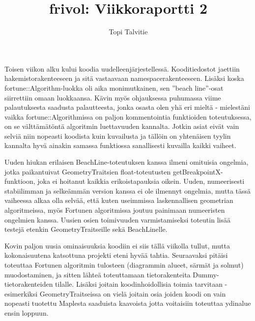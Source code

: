\documentclass[a4paper, 11pt, finnish]{article}
\author{Topi Talvitie}
\title{frivol: Viikkoraportti 2}
\begin{document}
\maketitle

Toisen viikon alku kului koodia uudelleenjärjestellessä. Kooditiedostot jaettiin hakemistorakenteeseen ja sitä vastaavaan namespacerakenteeseen. Lisäksi koska fortune::Algorithm-luokka oli aika monimutkainen, sen ''beach line''-osat siirrettiin omaan luokkaansa. Kävin myös ohjauksessa puhumassa viime palautuksesta saadusta palautteesta, jonka osasta olen yhä eri mieltä - mielestäni vaikka fortune::Algorithmissa on paljon kommentointia funktioiden toteutuksessa, on se välttämätöntä algoritmin luettavuuden kannalta. Jotkin asiat eivät vain selviä niin nopeasti koodista kuin kuvailusta ja tällöin on yhtenäisen tyylin kannalta hyvä ainakin samassa funktiossa sanallisesti kuvailla kaikki vaiheet.

Uuden hiukan erilaisen BeachLine-toteutuksen kanssa ilmeni omituisia ongelmia, jotka paikantuivat GeometryTraitsien float-toteutusten getBreakpointX-funktioon, joka ei hoitanut kaikkia erikoistapauksia oikein. Uuden, numeerisesti stabiilimman ja selkeämmän version kanssa ei ole ilmennyt ongelmia, mutta tässä vaiheessa alkaa olla selvää, että kuten useimmissa laskennallisen geometrian algoritmeissa, myös Fortunen algoritmissa joutuu painimaan numeeristen ongelmien kanssa. Uusien osien toimivuuden varmistamiseksi toteutin lisää testejä etenkin GeometryTraitseille sekä BeachLinelle.

Kovin paljon uusia ominaisuuksia koodiin ei siis tällä viikolla tullut, mutta kokonaisuutena katsottuna projekti eteni hyvää tahtia. Seuraavaksi pitäisi toteuttaa Fortunen algoritmin tulosteen (diagrammin alueet, särmät ja solmut) muodostaminen, ja sitten lähteä toteuttamaan tietorakenteita Dummy-tietorakenteiden tilalle. Lisäksi joitain koodinhoidollisia toimia tarvitaan - esimerkiksi GeometryTraitseissa on vielä joitain osia joiden koodi on vain nopeasti tuotettu Maplesta saaduista kaavoista jotta voitaisiin toteuttaa ydinalue ensin loppuun.
\end{document}
